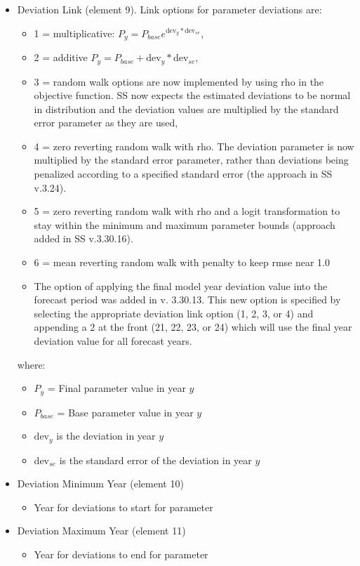 \begin{itemize}
\item Deviation Link (element 9). Link options for parameter deviations are:
	\begin{itemize}
		\item 1 = multiplicative: $P_y = P_{base}e^{\text{dev}_y*\text{dev}_{se}}$,
		\item 2 = additive $P_y = P_{base} + \text{dev}_y*\text{dev}_{se}$,
		\item 3 = random walk options are now implemented by using rho in the objective function. SS now expects the estimated deviations to be normal in distribution and the deviation values are multiplied by the standard error parameter as they are used,
		\item 4 = zero reverting random walk with rho. The deviation parameter is now multiplied by the standard error parameter, rather than deviations being penalized according to a specified standard error (the approach in SS v.3.24).
		\item 5 = zero reverting random walk with rho and a logit transformation to stay within the minimum and maximum parameter bounds (approach added in SS v.3.30.16).
		\item 6 = mean reverting random walk with penalty to keep rmse near 1.0
		\item The option of applying the final model year deviation value into the forecast period was added in v. 3.30.13.  This new option is specified by selecting the appropriate deviation link option (1, 2, 3, or 4) and appending a 2 at the front (21, 22, 23, or 24) which will use the final year deviation value for all forecast years. 
	\end{itemize}
	where: 
	\begin{itemize}
	     \item $P_{y}$ = Final parameter value in year $y$
         \item $P_{base}$ = Base parameter value in year $y$
		 \item $\text{dev}_y$ is the deviation in year $y$
		 \item $\text{dev}_{se}$ is the standard error of the deviation in year $y$
	\end{itemize}
\item Deviation  Minimum Year (element 10)
	\begin{itemize}
		\item Year for deviations to start for parameter
	\end{itemize}
	
\item Deviation  Maximum Year (element 11)
	\begin{itemize}
		\item Year for deviations to end for parameter
	\end{itemize}
	

\end{itemize}
